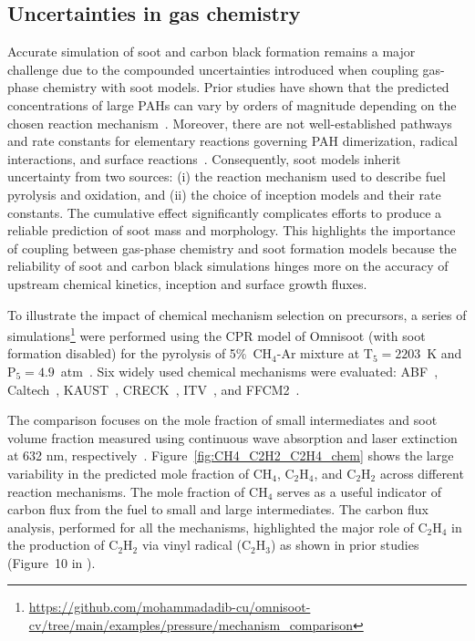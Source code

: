 \subsection{Uncertainties in gas chemistry}
\label{sec:uncergaschem}
Accurate simulation of soot and carbon black formation remains a major challenge due to the compounded uncertainties introduced when coupling gas-phase chemistry with soot models. Prior studies have shown that the predicted concentrations of large PAHs can vary by orders of magnitude depending on the chosen reaction mechanism~\citep{wang2023systematic}. Moreover, there are not well-established pathways and rate constants for elementary reactions governing PAH dimerization, radical interactions, and surface reactions~\citep{martin2022soot}. Consequently, soot models inherit uncertainty from two sources: (i) the reaction mechanism used to describe fuel pyrolysis and oxidation, and (ii) the choice of inception models and their rate constants. The cumulative effect significantly complicates efforts to produce a reliable prediction of soot mass and morphology. This highlights the importance of coupling between gas-phase chemistry and soot formation models because the reliability of soot and carbon black simulations hinges more on the accuracy of upstream chemical kinetics, inception and surface growth fluxes.

To illustrate the impact of chemical mechanism selection on precursors, a series of simulations\footnote{\href{https://github.com/mohammadadib-cu/omnisoot-cv/tree/main/examples/pressure/mechanism_comparison}{https://github.com/mohammadadib-cu/omnisoot-cv/tree/main/examples/pressure/mechanism\_comparison}} were performed using the CPR model of Omnisoot (with soot formation disabled) for the pyrolysis of 5\%~$\mathrm{CH_4}$-Ar mixture at $\mathrm{T_5}=2203$~K and $\mathrm{P_5}=4.9$~atm~\citep{clack2025}. Six widely used chemical mechanisms were evaluated: ABF~\citep{appel2000kinetic}, Caltech~\citep{blanquart2009chemical}, KAUST~\citep{wang2013pah}, CRECK~\citep{saggese2015kinetic}, ITV~\citep{hellmuth2024role}, and FFCM2~\citep{ZDV2023}.

The comparison focuses on the mole fraction of small intermediates and soot volume fraction measured using continuous wave absorption and laser extinction at 632 nm, respectively~\citep{clack2025}. Figure~\ref{fig:CH4_C2H2_C2H4_chem} shows the large variability in the predicted mole fraction of $\mathrm{CH_4}$, $\mathrm{C_2H_4}$, and $\mathrm{C_2H_2}$ across different reaction mechanisms. The mole fraction of $\mathrm{CH_4}$ serves as a useful indicator of carbon flux from the fuel to small and large intermediates. The carbon flux analysis, performed for all the mechanisms, highlighted the major role of $\mathrm{C_2H_4}$ in the production of $\mathrm{C_2H_2}$ via vinyl radical ($\mathrm{C_2H_3}$) as shown in prior studies (Figure~10 in \citep{wang2023systematic}). 

